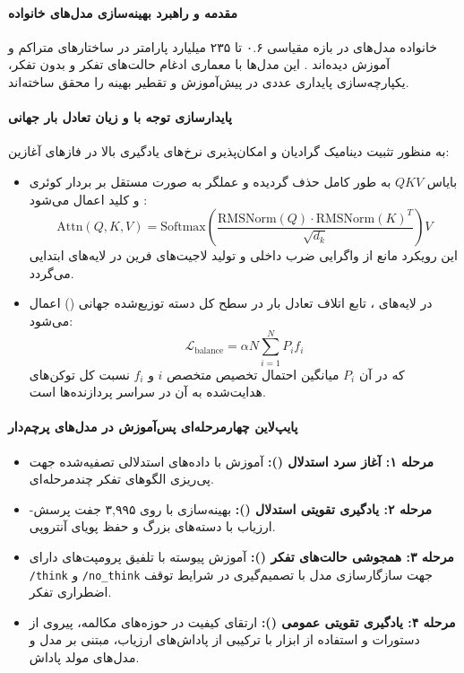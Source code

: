 \item {}

\paragraph*{مقدمه و راهبرد بهینه‌سازی مدل‌های خانواده }
خانواده مدل‌های  در بازه مقیاسی ۰.۶ تا ۲۳۵ میلیارد پارامتر در ساختارهای متراکم و  آموزش دیده‌اند \cite{qwen2025qwen3}. این مدل‌ها با معماری ادغام حالت‌های تفکر و بدون تفکر، یکپارچه‌سازی پایداری عددی در پیش‌آموزش و تقطیر بهینه را محقق ساخته‌اند.

\paragraph*{پایدارسازی توجه با  و زیان تعادل بار جهانی}
به منظور تثبیت دینامیک گرادیان و امکان‌پذیری نرخ‌های یادگیری بالا در فازهای آغازین:
\begin{itemize}
    \item بایاس $QKV$ به طور کامل حذف گردیده و عملگر  به صورت مستقل بر بردار کوئری و کلید اعمال می‌شود \cite{dehghani2023scaling}:
    \begin{equation}
        \text{Attn}(Q, K, V) = \text{Softmax}\left( \frac{\text{RMSNorm}(Q) \cdot \text{RMSNorm}(K)^T}{\sqrt{d_k}} \right) V
    \end{equation}
    این رویکرد مانع از واگرایی ضرب داخلی و تولید لاجیت‌های فرین در لایه‌های ابتدایی می‌گردد.
    \item در لایه‌های ، تابع اتلاف تعادل بار در سطح کل دسته توزیع‌شده جهانی () \cite{qiu2025demons} اعمال می‌شود:
    \begin{equation}
        \mathcal{L}_{\text{balance}} = \alpha N \sum_{i=1}^N P_i f_i
    \end{equation}
    که در آن $P_i$ میانگین احتمال تخصیص متخصص $i$ و $f_i$ نسبت کل توکن‌های هدایت‌شده به آن در سراسر پردازنده‌ها است.
\end{itemize}

\paragraph*{پایپ‌لاین چهارمرحله‌ای پس‌آموزش در مدل‌های پرچم‌دار}
\begin{itemize}
    \item \textbf{مرحله ۱: آغاز سرد استدلال ():} آموزش با داده‌های استدلالی تصفیه‌شده جهت پی‌ریزی الگوهای تفکر چندمرحله‌ای.
    \item \textbf{مرحله ۲: یادگیری تقویتی استدلال ():} بهینه‌سازی با  روی ۳,۹۹۵ جفت پرسش-ارزیاب با دسته‌های بزرگ و حفظ پویای آنتروپی.
    \item \textbf{مرحله ۳: همجوشی حالت‌های تفکر ():} آموزش پیوسته  با تلفیق پرومپت‌های دارای \verb|/think| و \verb|/no_think| جهت سازگارسازی مدل با تصمیم‌گیری در شرایط توقف اضطراری تفکر.
    \item \textbf{مرحله ۴: یادگیری تقویتی عمومی ():} ارتقای کیفیت در حوزه‌های مکالمه، پیروی از دستورات و استفاده از ابزار با ترکیبی از پاداش‌های ارزیاب، مبتنی بر مدل و مدل‌های مولد پاداش.
\end{itemize}

